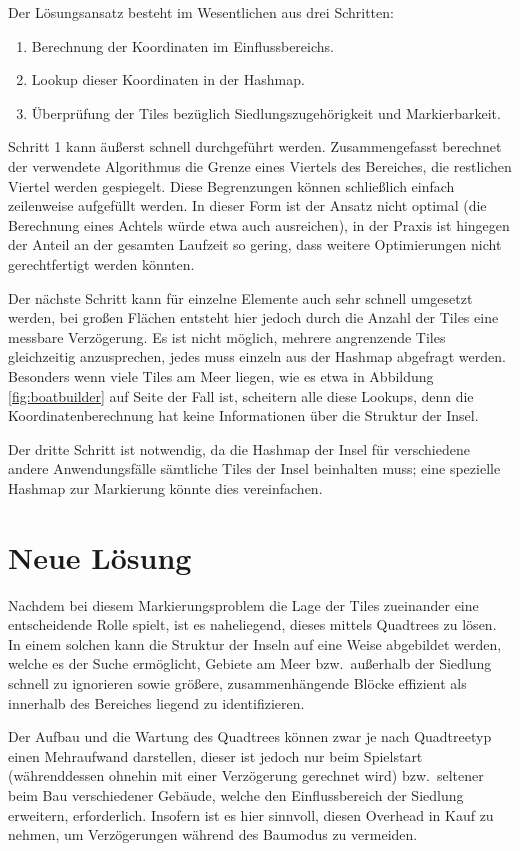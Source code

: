 \documentclass[%
			fontsize=12pt,%
			paper=a4,%
			DIV11,
			liststotoc,
			bibtotoc,
			draft=false,%
			titlepage
			]{scrartcl}
\begin{document}
Der Lösungsansatz besteht im Wesentlichen aus drei Schritten:
\begin{enumerate}
	\item Berechnung der Koordinaten im Einflussbereichs.
	\item Lookup dieser Koordinaten in der Hashmap.
	\item Überprüfung der Tiles bezüglich Siedlungszugehörigkeit und Markierbarkeit.
\end{enumerate}

Schritt 1 kann äußerst schnell durchgeführt werden.
Zusammengefasst berechnet der verwendete Algorithmus die Grenze eines Viertels des Bereiches, die restlichen Viertel werden gespiegelt.
Diese Begrenzungen können schließlich einfach zeilenweise aufgefüllt werden.
In dieser Form ist der Ansatz nicht optimal (die Berechnung eines Achtels würde etwa auch \mbox{ausreichen}), in der Praxis ist hingegen der Anteil an der gesamten Laufzeit so gering, dass weitere Optimierungen nicht gerechtfertigt werden könnten.

Der nächste Schritt kann für einzelne Elemente auch sehr schnell umgesetzt werden, bei großen Flächen entsteht hier jedoch durch die Anzahl der Tiles eine messbare Verzögerung.
Es ist nicht möglich, mehrere angrenzende Tiles gleichzeitig anzusprechen, jedes muss einzeln aus der Hashmap abgefragt werden.
Besonders wenn viele Tiles am Meer liegen, wie es etwa in Abbildung \ref{fig:boatbuilder} auf Seite \pageref{fig:boatbuilder} der Fall ist, scheitern alle diese Lookups, denn die Koordinatenberechnung hat keine Informationen über die Struktur der Insel.

Der dritte Schritt ist notwendig, da die Hashmap der Insel für verschiedene andere Anwendungsfälle sämtliche Tiles der Insel beinhalten muss; eine spezielle Hashmap zur Markierung könnte dies vereinfachen.

\section{Neue Lösung}
Nachdem bei diesem Markierungsproblem die Lage der Tiles zueinander eine entscheidende Rolle spielt, ist es naheliegend, dieses mittels Quadtrees zu lösen.
In einem solchen kann die Struktur der Inseln auf eine Weise abgebildet werden,
welche es der Suche ermöglicht, Gebiete am Meer bzw.\ außerhalb der Siedlung schnell zu ignorieren sowie größere, zusammenhängende Blöcke effizient als innerhalb des Bereiches liegend zu identifizieren.

Der Aufbau und die Wartung des Quadtrees können zwar je nach Quadtreetyp einen Mehraufwand darstellen, dieser ist jedoch nur beim Spielstart (währenddessen ohnehin mit einer Verzögerung gerechnet wird) bzw.\ seltener beim Bau verschiedener Gebäude, welche den Einflussbereich der Siedlung erweitern, erforderlich.
Insofern ist es hier sinnvoll, diesen Overhead in Kauf zu nehmen, um Verzögerungen während des Baumodus zu vermeiden.
\end{document}
